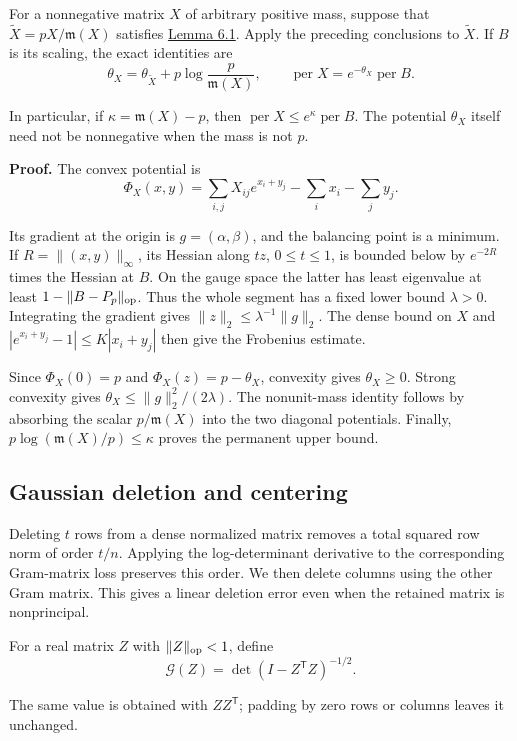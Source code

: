 \documentclass[11pt,a4paper]{article}
\newcommand{\paperref}[2]{\hyperref[#1]{#2}}
\begin{document}
For a nonnegative matrix \(X\) of arbitrary positive mass, suppose that \(\widetilde X=pX/\mathfrak m(X)\) satisfies \paperref{thm-6.1}{Lemma 6.1}. Apply the preceding conclusions to \(\widetilde X\). If \(B\) is its scaling, the exact identities are
\[\theta_X=\theta_{\widetilde X}+p\log\frac p{\mathfrak m(X)},\qquad \operatorname{per}X=e^{-\theta_X}\operatorname{per}B.\]

In particular, if \(\kappa=\mathfrak m(X)-p\), then \(\operatorname{per}X\le e^\kappa\operatorname{per}B\). The potential \(\theta_X\) itself need not be nonnegative when the mass is not \(p\).

\textbf{Proof.} The convex potential is
\[\Phi_X(x,y)=\sum_{i,j}X_{ij}e^{x_i+y_j}-\sum_i x_i-\sum_j y_j.\]

Its gradient at the origin is \(g=(\alpha,\beta)\), and the balancing point is a minimum. If \(R=\|(x,y)\|_\infty\), its Hessian along \(tz\), \(0\le t\le1\), is bounded below by \(e^{-2R}\) times the Hessian at \(B\). On the gauge space the latter has least eigenvalue at least \(1-\|B-P_p\|_{\rm op}\). Thus the whole segment has a fixed lower bound \(\lambda>0\). Integrating the gradient gives \(\|z\|_2\le\lambda^{-1}\|g\|_2\). The dense bound on \(X\) and \(|e^{x_i+y_j}-1|\le K|x_i+y_j|\) then give the Frobenius estimate.

Since \(\Phi_X(0)=p\) and \(\Phi_X(z)=p-\theta_X\), convexity gives \(\theta_X\ge0\). Strong convexity gives \(\theta_X\le\|g\|_2^2/(2\lambda)\). The nonunit-mass identity follows by absorbing the scalar \(p/\mathfrak m(X)\) into the two diagonal potentials. Finally, \(p\log(\mathfrak m(X)/p)\le\kappa\) proves the permanent upper bound.

\subsection{Gaussian deletion and centering}\label{sec-6.2}

Deleting \(t\) rows from a dense normalized matrix removes a total squared row norm of order \(t/n\). Applying the log-determinant derivative to the corresponding Gram-matrix loss preserves this order. We then delete columns using the other Gram matrix. This gives a linear deletion error even when the retained matrix is nonprincipal.

For a real matrix \(Z\) with \(\|Z\|_{\rm op}<1\), define
\[\mathcal G(Z)=\det(I-Z^{\mathsf T}Z)^{-1/2}.\]

The same value is obtained with \(ZZ^{\mathsf T}\); padding by zero rows or columns leaves it unchanged.
\end{document}
